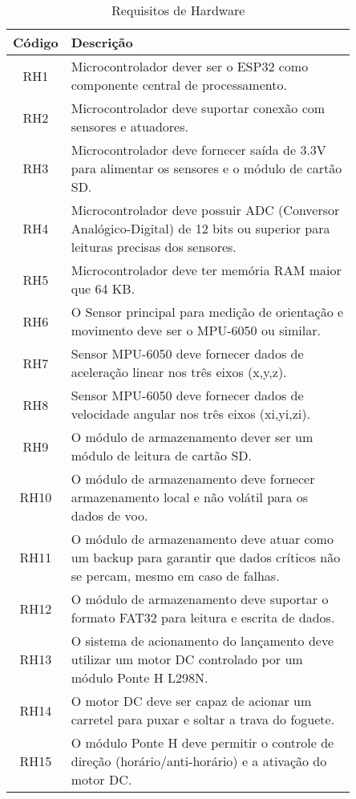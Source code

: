 \begin{table}[H]
\centering
\scriptsize
\setlength{\tabcolsep}{4pt}
\caption{Requisitos de Hardware}
\begin{tabular}{|c|p{0.85\linewidth}|}
\hline
\textbf{Código} & \textbf{Descrição} \\
\hline
RH1 & Microcontrolador dever ser o ESP32 como componente central de processamento. \\
\hline
RH2 & Microcontrolador deve suportar conexão com sensores e atuadores. \\
\hline
RH3 & Microcontrolador deve fornecer saída de 3.3V para alimentar os sensores e o módulo de cartão SD. \\
\hline
RH4 & Microcontrolador deve possuir ADC (Conversor Analógico-Digital) de 12 bits ou superior para leituras precisas dos sensores. \\
\hline 
RH5 & Microcontrolador deve ter memória RAM maior que 64 KB. \\
\hline
RH6 & O Sensor principal para medição de orientação e movimento deve ser o MPU-6050 ou similar. \\
\hline
RH7 & Sensor MPU-6050 deve fornecer dados de aceleração linear nos três eixos (x,y,z). \\
\hline
RH8 & Sensor MPU-6050 deve fornecer dados de velocidade angular nos três eixos (xi,yi,zi). \\
\hline
RH9 & O módulo de armazenamento dever ser um módulo de leitura de cartão SD. \\
\hline
RH10 & O módulo de armazenamento deve fornecer armazenamento local e não volátil para os dados de voo. \\
\hline
RH11 & O módulo de armazenamento deve atuar como um backup para garantir que dados críticos não se percam, mesmo em caso de falhas. \\
\hline
RH12 & O módulo de armazenamento deve suportar o formato FAT32 para leitura e escrita de dados. \\
\hline
RH13 & O sistema de acionamento do lançamento deve utilizar um motor DC controlado por um módulo Ponte H L298N. \\
\hline
RH14 & O motor DC deve ser capaz de acionar um carretel para puxar e soltar a trava do foguete. \\
\hline
RH15 & O módulo Ponte H deve permitir o controle de direção (horário/anti-horário) e a ativação do motor DC. \\
\hline
\end{tabular}
\label{tab:requisitos-hardware}
\end{table}

